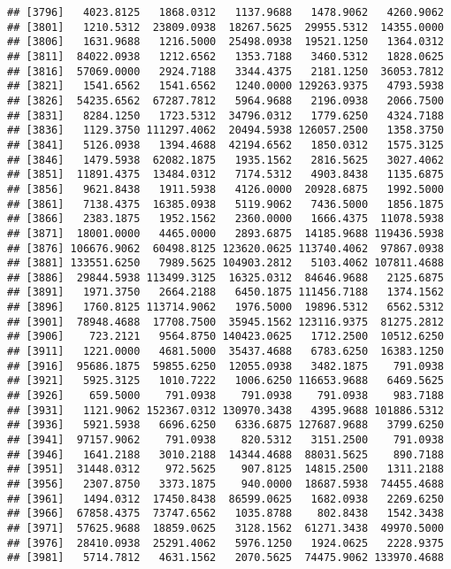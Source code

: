\documentclass[]{article}
\begin{document}
\begin{verbatim}
## [3796]   4023.8125   1868.0312   1137.9688   1478.9062   4260.9062
## [3801]   1210.5312  23809.0938  18267.5625  29955.5312  14355.0000
## [3806]   1631.9688   1216.5000  25498.0938  19521.1250   1364.0312
## [3811]  84022.0938   1212.6562   1353.7188   3460.5312   1828.0625
## [3816]  57069.0000   2924.7188   3344.4375   2181.1250  36053.7812
## [3821]   1541.6562   1541.6562   1240.0000 129263.9375   4793.5938
## [3826]  54235.6562  67287.7812   5964.9688   2196.0938   2066.7500
## [3831]   8284.1250   1723.5312  34796.0312   1779.6250   4324.7188
## [3836]   1129.3750 111297.4062  20494.5938 126057.2500   1358.3750
## [3841]   5126.0938   1394.4688  42194.6562   1850.0312   1575.3125
## [3846]   1479.5938  62082.1875   1935.1562   2816.5625   3027.4062
## [3851]  11891.4375  13484.0312   7174.5312   4903.8438   1135.6875
## [3856]   9621.8438   1911.5938   4126.0000  20928.6875   1992.5000
## [3861]   7138.4375  16385.0938   5119.9062   7436.5000   1856.1875
## [3866]   2383.1875   1952.1562   2360.0000   1666.4375  11078.5938
## [3871]  18001.0000   4465.0000   2893.6875  14185.9688 119436.5938
## [3876] 106676.9062  60498.8125 123620.0625 113740.4062  97867.0938
## [3881] 133551.6250   7989.5625 104903.2812   5103.4062 107811.4688
## [3886]  29844.5938 113499.3125  16325.0312  84646.9688   2125.6875
## [3891]   1971.3750   2664.2188   6450.1875 111456.7188   1374.1562
## [3896]   1760.8125 113714.9062   1976.5000  19896.5312   6562.5312
## [3901]  78948.4688  17708.7500  35945.1562 123116.9375  81275.2812
## [3906]    723.2121   9564.8750 140423.0625   1712.2500  10512.6250
## [3911]   1221.0000   4681.5000  35437.4688   6783.6250  16383.1250
## [3916]  95686.1875  59855.6250  12055.0938   3482.1875    791.0938
## [3921]   5925.3125   1010.7222   1006.6250 116653.9688   6469.5625
## [3926]    659.5000    791.0938    791.0938    791.0938    983.7188
## [3931]   1121.9062 152367.0312 130970.3438   4395.9688 101886.5312
## [3936]   5921.5938   6696.6250   6336.6875 127687.9688   3799.6250
## [3941]  97157.9062    791.0938    820.5312   3151.2500    791.0938
## [3946]   1641.2188   3010.2188  14344.4688  88031.5625    890.7188
## [3951]  31448.0312    972.5625    907.8125  14815.2500   1311.2188
## [3956]   2307.8750   3373.1875    940.0000  18687.5938  74455.4688
## [3961]   1494.0312  17450.8438  86599.0625   1682.0938   2269.6250
## [3966]  67858.4375  73747.6562   1035.8788    802.8438   1542.3438
## [3971]  57625.9688  18859.0625   3128.1562  61271.3438  49970.5000
## [3976]  28410.0938  25291.4062   5976.1250   1924.0625   2228.9375
## [3981]   5714.7812   4631.1562   2070.5625  74475.9062 133970.4688

\end{verbatim}
\end{document}

